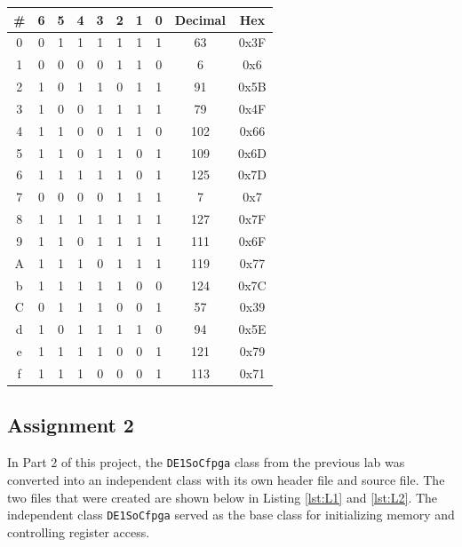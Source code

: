 \documentclass[
	letterpaper, %
	10pt, %
]{CSUniSchoolLabReport}
\begin{document}
   \begin{center}
      \begin{tabular}[h!]{| c | c | c | c | c | c | c | c | c | c |}
        \hline
        \# & 6 & 5 & 4 & 3 & 2 & 1 & 0 & Decimal & Hex \\
        \hline
        0 & 0 & 1 & 1 & 1 & 1 & 1 & 1 & 63 & 0x3F\\
        \hline
        1 & 0 & 0 & 0 & 0 & 1 & 1 & 0 & 6 & 0x6\\
        \hline
        2 & 1 & 0 & 1 & 1 & 0 & 1 & 1 & 91 & 0x5B\\
        \hline
        3 & 1 & 0 & 0 & 1 & 1 & 1 & 1 & 79 & 0x4F\\
        \hline
        4 & 1 & 1 & 0 & 0 & 1 & 1 & 0 & 102 & 0x66\\
        \hline
        5 & 1 & 1 & 0 & 1 & 1 & 0 & 1 & 109 & 0x6D\\
        \hline
        6 & 1 & 1 & 1 & 1 & 1 & 0 & 1 & 125 & 0x7D\\
        \hline
        7 & 0 & 0 & 0 & 0 & 1 & 1 & 1 & 7 & 0x7\\
        \hline
        8 & 1 & 1 & 1 & 1 & 1 & 1 & 1 & 127 & 0x7F\\
        \hline
        9 & 1 & 1 & 0 & 1 & 1 & 1 & 1 & 111 & 0x6F\\
        \hline
        A & 1 & 1 & 1 & 0 & 1 & 1 & 1 & 119 & 0x77\\
        \hline
        b & 1 & 1 & 1 & 1 & 1 & 0 & 0 & 124 & 0x7C\\
        \hline
        C & 0 & 1 & 1 & 1 & 0 & 0 & 1 & 57 & 0x39\\
        \hline
        d & 1 & 0 & 1 & 1 & 1 & 1 & 0 & 94 & 0x5E\\
        \hline
        e & 1 & 1 & 1 & 1 & 0 & 0 & 1 & 121 & 0x79\\
        \hline
        f & 1 & 1 & 1 & 0 & 0 & 0 & 1 & 113 & 0x71\\
        \hline
      \end{tabular}
    \end{center}

\subsection{Assignment 2}

In Part 2 of this project, the \texttt{DE1SoCfpga} class from the previous lab was converted into an independent class with its own header file and source file. The two files that were created are shown below in Listing \ref{lst:L1} and \ref{lst:L2}. The independent class \texttt{DE1SoCfpga} served as the base class for initializing memory and controlling register access.
\end{document}

